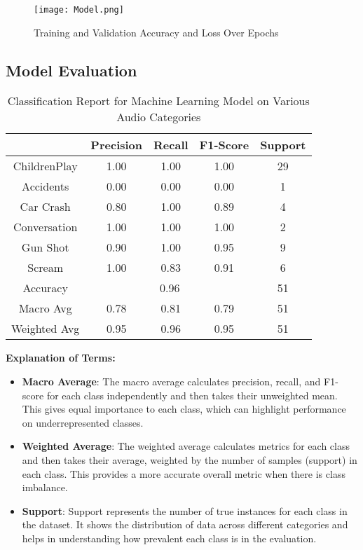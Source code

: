 \documentclass[conference]{IEEEtran}
\begin{document}
\begin{figure}[h!]
    \centering
    \texttt{[image: Model.png]}
    \caption{Training and Validation Accuracy and Loss Over Epochs}
    \label{fig:loss_plot}
\end{figure}

\subsection{Model Evaluation}
\begin{table}[h!]
    \centering
    \caption{Classification Report for Machine Learning Model on Various Audio Categories}
    \begin{tabular}{|c|c|c|c|c|}
        \hline
        & \textbf{Precision} & \textbf{Recall} & \textbf{F1-Score} & \textbf{Support} \\
        \hline
        ChildrenPlay & 1.00 & 1.00 & 1.00 & 29 \\
        Accidents & 0.00 & 0.00 & 0.00 & 1 \\
        Car Crash & 0.80 & 1.00 & 0.89 & 4 \\
        Conversation & 1.00 & 1.00 & 1.00 & 2 \\
        Gun Shot & 0.90 & 1.00 & 0.95 & 9 \\
        Scream & 1.00 & 0.83 & 0.91 & 6 \\
        \hline
        Accuracy & \multicolumn{3}{c|}{0.96} & 51 \\
        \hline
        Macro Avg & 0.78 & 0.81 & 0.79 & 51 \\
        Weighted Avg & 0.95 & 0.96 & 0.95 & 51 \\
        \hline
    \end{tabular}
    \label{tab:classification_report}
\end{table}

\noindent
\textbf{Explanation of Terms:}
\begin{itemize}
    \item \textbf{Macro Average}: The macro average calculates precision, recall, and F1-score for each class independently and then takes their unweighted mean. This gives equal importance to each class, which can highlight performance on underrepresented classes.
    \item \textbf{Weighted Average}: The weighted average calculates metrics for each class and then takes their average, weighted by the number of samples (support) in each class. This provides a more accurate overall metric when there is class imbalance.
    \item \textbf{Support}: Support represents the number of true instances for each class in the dataset. It shows the distribution of data across different categories and helps in understanding how prevalent each class is in the evaluation.
\end{itemize}
\end{document}
